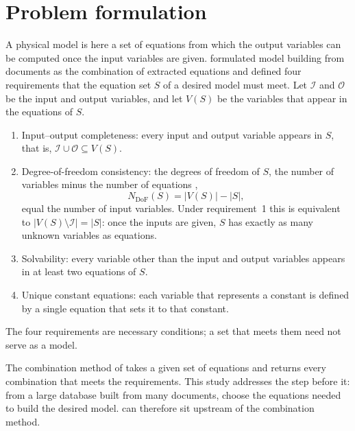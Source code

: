 \section{Problem formulation}\label{sec:formulation}

A physical model is here a set of equations from which the output variables can be computed once
the input variables are given. \citet{CombineEq} formulated model building from documents as the
combination of extracted equations and defined four requirements that the equation set $S$ of a
desired model must meet. Let $\mathcal{I}$ and $\mathcal{O}$ be the input and output variables, and
let $V(S)$ be the variables that appear in the equations of $S$.
\begin{enumerate}
  \item Input--output completeness: every input and output variable appears in $S$, that is,
    $\mathcal{I} \cup \mathcal{O} \subseteq V(S)$.
  \item Degree-of-freedom consistency: the degrees of freedom of $S$, the number of variables minus
    the number of equations \citep{Seborg},
    \begin{equation}
      N_{\mathrm{DoF}}(S) = |V(S)| - |S| ,
      \label{eq:dof}
    \end{equation}
    equal the number of input variables. Under requirement~1 this is equivalent to
    $|V(S) \setminus \mathcal{I}| = |S|$: once the inputs are given, $S$ has exactly as many
    unknown variables as equations.
  \item Solvability: every variable other than the input and output variables appears in at least
    two equations of $S$.
  \item Unique constant equations: each variable that represents a constant is defined by a single
    equation that sets it to that constant.
\end{enumerate}
The four requirements are necessary conditions; a set that meets them need not serve as a model.

The combination method of \citet{CombineEq} takes a given set of equations and returns every
combination that meets the requirements. This study addresses the step before it: from a large
database built from many documents, choose the equations needed to build the desired model. \ours{} can therefore sit upstream of the combination method.

